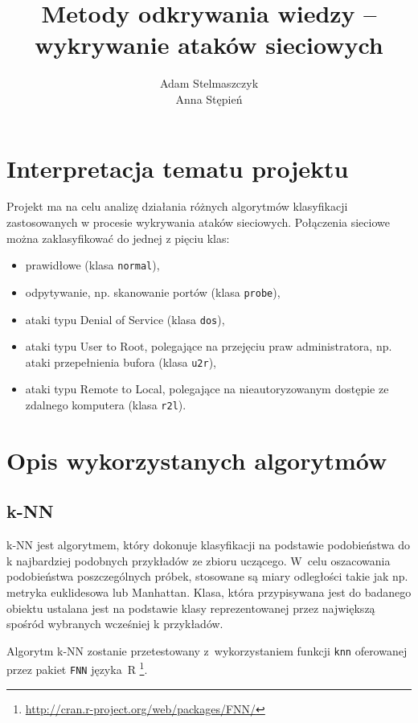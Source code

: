 \documentclass[a4paper, 12pt]{article}
\title{Metody odkrywania wiedzy -- wykrywanie ataków sieciowych}
\author{Adam Stelmaszczyk\\ Anna Stępień}
\begin{document}
\maketitle

\tableofcontents

\newpage

\section{Interpretacja tematu projektu}
Projekt ma na celu analizę działania różnych algorytmów klasyfikacji zastosowanych
w procesie wykrywania ataków sieciowych. Połączenia sieciowe można zaklasyfikować do jednej
z pięciu klas:
\begin{itemize}
  \item prawidłowe (klasa \texttt{normal}),
  \item odpytywanie, np. skanowanie portów (klasa \texttt{probe}),
  \item ataki typu Denial of Service (klasa \texttt{dos}),
  \item ataki typu User to Root, polegające na przejęciu praw administratora, 
np. ataki przepełnienia bufora (klasa \texttt{u2r}),
  \item ataki typu Remote to Local, polegające na nieautoryzowanym dostępie ze zdalnego komputera 
(klasa \texttt{r2l}).
\end{itemize} 

\section{Opis wykorzystanych algorytmów}\label{algorithms}

\subsection{k-NN}
k-NN jest algorytmem, który dokonuje klasyfikacji na podstawie podobieństwa do k 
najbardziej podobnych przykładów ze zbioru uczącego. W~celu oszacowania podobieństwa 
poszczególnych próbek, stosowane są miary odległości takie jak np. metryka euklidesowa lub Manhattan. 
Klasa, która przypisywana jest do badanego obiektu ustalana jest na podstawie klasy 
reprezentowanej przez największą spośród wybranych wcześniej k przykładów.

Algorytm k-NN zostanie przetestowany z~wykorzystaniem funkcji 
\texttt{knn} oferowanej przez pakiet \texttt{FNN} języka~R 
\footnote{\url{http://cran.r-project.org/web/packages/FNN/}}.
\end{document}
